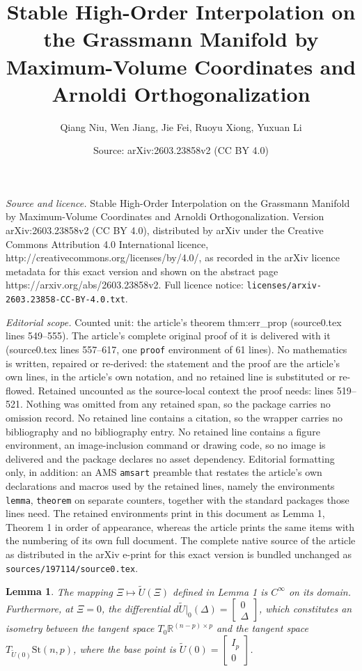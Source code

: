 \documentclass[10pt,a4paper]{amsart}
\title{Stable High-Order Interpolation on the Grassmann Manifold by Maximum-Volume Coordinates and Arnoldi Orthogonalization}
\author{Qiang Niu, Wen Jiang, Jie Fei, Ruoyu Xiong, Yuxuan Li}
\date{Source: arXiv:2603.23858v2 (CC BY 4.0)}
\newtheorem{lemma}{Lemma}
\begin{document}
\maketitle

\noindent\emph{Source and licence.} Stable High-Order Interpolation on the Grassmann Manifold by Maximum-Volume Coordinates and Arnoldi Orthogonalization. Version arXiv:2603.23858v2 (CC BY 4.0), distributed by arXiv under the Creative Commons Attribution 4.0 International licence, http://creativecommons.org/licenses/by/4.0/, as recorded in the arXiv licence metadata for this exact version and shown on the abstract page https://arxiv.org/abs/2603.23858v2. Full licence notice: \texttt{licenses/arxiv-2603.23858-CC-BY-4.0.txt}.\par\smallskip

\noindent\textit{Editorial scope.} Counted unit: the article's theorem thm:err\_prop (source0.tex lines 549--555). The article's complete original proof of it is delivered with it (source0.tex lines 557--617, one \texttt{proof} environment of 61 lines). No mathematics is written, repaired or re-derived: the statement and the proof are the article's own lines, in the article's own notation, and no retained line is substituted or re-flowed.  Retained uncounted as the source-local context the proof needs: lines 519--521.  Nothing was omitted from any retained span, so the package carries no omission record.  No retained line contains a citation, so the wrapper carries no bibliography and no bibliography entry.  No retained line contains a figure environment, an image-inclusion command or drawing code, so no image is delivered and the package declares no asset dependency.  Editorial formatting only, in addition: an AMS \texttt{amsart} preamble that restates the article's own declarations and macros used by the retained lines, namely the environments \texttt{lemma}, \texttt{theorem} on separate counters, together with the standard packages those lines need.  The retained environments print in this document as Lemma 1, Theorem 1 in order of appearance, whereas the article prints the same items with the numbering of its own full document.  The complete native source of the article as distributed in the arXiv e-print for this exact version is bundled unchanged as \texttt{sources/197114/source0.tex}.
\begin{lemma} \label{lem:smooth_iso}
The mapping $\Xi \mapsto \widetilde{U}(\Xi)$ defined in Lemma 1 is $C^\infty$ on its domain. Furthermore, at $\Xi = 0$, the differential $d\widetilde{U}|_0(\Delta) = \begin{bmatrix} 0 \\ \Delta \end{bmatrix}$, which constitutes an isometry between the tangent space $T_0 \mathbb{R}^{(n-p) \times p}$ and the tangent space $T_{\widetilde{U}(0)} \text{St}(n,p)$, where the base point is $\widetilde{U}(0) = \begin{bmatrix} I_p \\ 0 \end{bmatrix}$.
\end{lemma}
\end{document}
